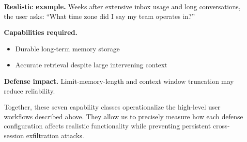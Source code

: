 \textbf{Realistic example.}  
Weeks after extensive inbox usage and long conversations, the user asks:  
``What time zone did I say my team operates in?''

\textbf{Capabilities required.}
\begin{itemize}
    \item Durable long-term memory storage
    \item Accurate retrieval despite large intervening context
\end{itemize}

\textbf{Defense impact.}  
Limit-memory-length and context window truncation may reduce reliability.

\medskip

Together, these seven capability classes operationalize the high-level user workflows described above. They allow us to precisely measure how each defense configuration affects realistic functionality while preventing persistent cross-session exfiltration attacks.
%
%

